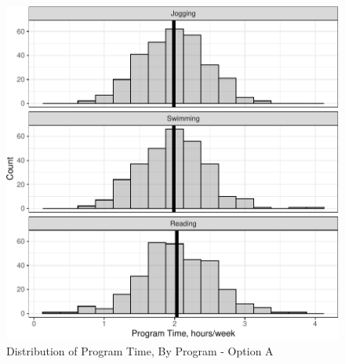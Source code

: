 \documentclass[
]{article}
\begin{document}
\begin{figure}[hb]

\includegraphics{Appendix_ex_weightloss_files/figure-latex/unnamed-chunk-41-1} \hfill{}

\caption{Distribution of Program Time, By Program - Option A}\label{fig:unnamed-chunk-41}
\end{figure}

\clearpage
\end{document}
